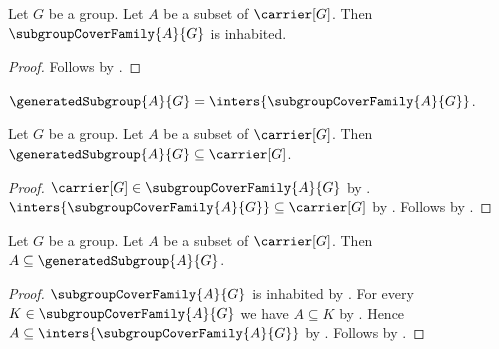 \begin{corollary}\label{subgroup_cover_family_inhabited}
    Let $G$ be a group.
    Let $A$ be a subset of $\carrier[G]$.
    Then $\subgroupCoverFamily{A}{G}$ is inhabited.
\end{corollary}
\begin{proof}
    Follows by .
\end{proof}

\begin{definition}\label{generated_subgroup}
    $\generatedSubgroup{A}{G}=
        \inters{\subgroupCoverFamily{A}{G}}$.
\end{definition}

\begin{proposition}\label{generated_subgroup_subseteq_carrier}
    Let $G$ be a group.
    Let $A$ be a subset of $\carrier[G]$.
    Then $\generatedSubgroup{A}{G}\subseteq\carrier[G]$.
\end{proposition}
\begin{proof}
    $\carrier[G]\in\subgroupCoverFamily{A}{G}$ by
        .
    $\inters{\subgroupCoverFamily{A}{G}}\subseteq\carrier[G]$ by
        .
    Follows by .
\end{proof}

\begin{proposition}\label{generated_subgroup_contains_generators}
    Let $G$ be a group.
    Let $A$ be a subset of $\carrier[G]$.
    Then $A\subseteq\generatedSubgroup{A}{G}$.
\end{proposition}
\begin{proof}
    $\subgroupCoverFamily{A}{G}$ is inhabited by
        .
    For every $K\in\subgroupCoverFamily{A}{G}$ we have $A\subseteq K$ by
        .
    Hence $A\subseteq\inters{\subgroupCoverFamily{A}{G}}$ by
        .
    Follows by .
\end{proof}

